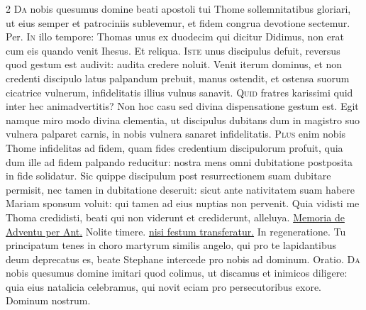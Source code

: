 \begin{multicols*}{2}
\lettrine[lines=2]{\zallmancaps \color{Blue} D}{a} nobis quesumus domine beati apostoli tui Thome sollemnitatibus gloriari, ut eius semper et patrociniis sublevemur, et fidem congrua devotione sectemur. Per.
\lettrine[lines=2]{\zallmancaps \color{Red} I}{n} illo tempore: Thomas unus ex duodecim qui dicitur Didimus, non erat cum eis quando venit Ihesus. Et reliqua.
 \grecross
\lettrine[lines=2]{\zallmancaps \color{Blue} I}{ste} unus discipulus defuit, reversus quod gestum est audivit: audita credere noluit. Venit iterum dominus, et non credenti discipulo latus palpandum prebuit, manus ostendit, et ostensa suorum cicatrice vulnerum, infidelitatis illius vulnus sanavit.
\lettrine[lines=2]{\zallmancaps \color{Red} Q}{uid} fratres karissimi quid inter hec animadvertitis? Non hoc casu sed divina dispensatione gestum est. Egit namque miro modo divina clementia, ut discipulus dubitans dum in magistro suo vulnera palparet carnis, in nobis vulnera sanaret infidelitatis.
\lettrine[lines=2]{\zallmancaps \color{Blue} P}{lus} enim nobis Thome infidelitas ad fidem, quam fides credentium discipulorum profuit, quia dum ille ad fidem palpando reducitur: nostra mens omni dubitatione postposita in fide solidatur. Sic quippe discipulum post resurrectionem suam dubitare permisit, nec tamen in dubitatione deseruit: sicut ante nativitatem suam habere Mariam sponsum voluit: qui tamen ad eius nuptias non pervenit.
 Quia vidisti me Thoma credidisti, beati qui non viderunt et crediderunt, alleluya.
\newline \ul{Memoria de Adventu per Ant.} Nolite timere. \ul{nisi festum transferatur.}
 In regeneratione.
{\color{Red} }%
 Tu principatum tenes in choro martyrum similis angelo, qui pro te lapidantibus deum deprecatus es, beate Stephane intercede pro nobis ad dominum. {\color{Red} Oratio.}
\lettrine[lines=2]{\zallmancaps \color{Red} D}{a} nobis quesumus domine imitari quod colimus, ut discamus et inimicos diligere: quia eius natalicia celebramus, qui novit eciam pro persecutoribus exore. Dominum nostrum.

\end{multicols*}
